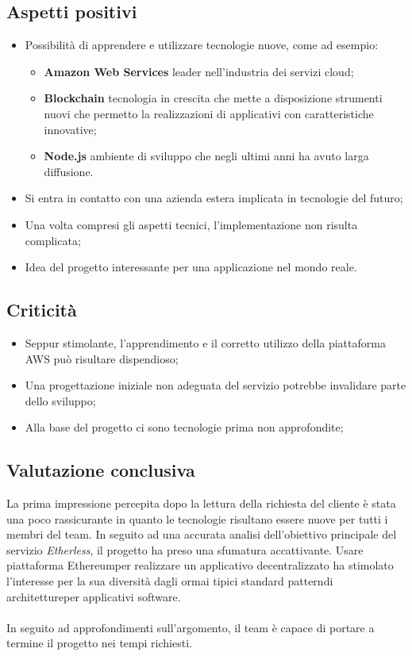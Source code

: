 \subsection{Aspetti positivi}
\begin{itemize}
	\item Possibilità di apprendere e utilizzare tecnologie nuove, come ad esempio:
		\begin{itemize}
			\item \textbf{Amazon Web Services} leader nell'industria dei servizi cloud\glo;
			\item \textbf{Blockchain\glo} tecnologia in crescita che mette a disposizione strumenti nuovi che permetto la realizzazioni di applicativi con caratteristiche innovative;
			\item \textbf{Node.js} ambiente di sviluppo che negli ultimi anni ha avuto larga diffusione.
		\end{itemize}
	\item Si entra in contatto con una azienda estera implicata in tecnologie del futuro;
	\item Una volta compresi gli aspetti tecnici, l'implementazione non risulta complicata;
	\item Idea del progetto interessante per una applicazione nel mondo reale.
\end{itemize}

\subsection{Criticità}
\begin{itemize}
	\item Seppur stimolante, l'apprendimento e il corretto utilizzo della piattaforma AWS può risultare dispendioso;
	\item Una progettazione iniziale non adeguata del servizio potrebbe invalidare parte dello sviluppo;
	\item Alla base del progetto ci sono tecnologie prima non approfondite;
\end{itemize}

\subsection{Valutazione conclusiva}
La prima impressione percepita dopo la lettura della richiesta del cliente è stata una poco rassicurante in quanto le tecnologie risultano essere nuove per tutti i membri del team. In seguito ad una accurata analisi dell'obiettivo principale del servizio \textit{Etherless}, il progetto ha preso una sfumatura accattivante. Usare piattaforma Ethereum\glo per realizzare un applicativo decentralizzato ha stimolato l'interesse per la sua diversità dagli ormai tipici standard pattern\glo di architetture\glo per applicativi software.
\\\\
In seguito ad approfondimenti sull'argomento, il team è capace di portare a termine il progetto nei tempi richiesti.